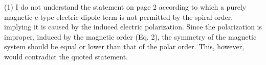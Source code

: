 (1) I do not understand the statement on page 2 according to which a purely magnetic c-type electric-dipole term is not permitted by the spiral order, implying it is caused by the induced electric polarization. Since the polarization is improper, induced by the magnetic order (Eq. 2), the symmetry of the magnetic system should be equal or lower than that of the polar order. This, however, would contradict the quoted statement.
